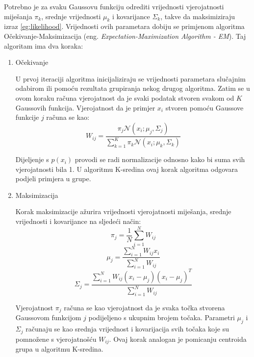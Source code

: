 \documentclass[utf8, diplomski, numeric]{fer}
\begin{document}
Potrebno je za svaku Gaussovu funkciju odrediti vrijednosti vjerojatnosti miješanja $\pi_k$, srednje vrijednosti $\mu_k$ i kovarijance $\Sigma_k$, takve da maksimiziraju izraz \ref{eg:likelihood}. Vrijednosti ovih parametara dobiju se primjenom algoritma Očekivanje-Maksimizacija (eng. \textit{Expectation-Maximization Algorithm - EM}). Taj algoritam ima dva koraka:
\begin{enumerate}
\item Očekivanje

U prvoj iteraciji algoritma inicijaliziraju se vrijednosti parametara slučajnim odabirom ili pomoću rezultata grupiranja nekog drugog algoritma. Zatim se u ovom koraku računa vjerojatnost da je svaki podatak stvoren svakom od $K$ Gaussovih funkcija. Vjerojatnost da je primjer $x_i$ stvoren pomoću Gaussove funkcije $j$ računa se kao:
\begin{equation}\label{eq:expectation}
W_{ij} = \frac{\pi_j \mathcal{N}(x_i;\mu_j,\Sigma_j)}{\sum_{k=1}^{K} \pi_k \mathcal{N}(x_i;\mu_k,\Sigma_k)}
\end{equation}

Dijeljenje s $p(x_i)$ provodi se radi normalizacije odnosno kako bi suma svih vjerojatnosti bila 1. U algoritmu K-sredina ovaj korak algoritma odgovara podjeli primjera u grupe.
\item Maksimizacija

Korak maksimizacije ažurira vrijednosti vjerojatnosti miješanja, srednje vrijednosti i kovarijance na sljedeći način:
\begin{equation}\label{eq:max}
\pi_j = \frac{1}{N}\sum_{i=1}^{N} W_{ij}
\end{equation}
\begin{equation}\label{eq:max}
\mu_j = \frac{\sum_{i=1}^{N} W_{ij}x_i}{\sum_{i=1}^{N} W_{ij}}
\end{equation}
\begin{equation}\label{eq:max}
\Sigma_j = \frac{\sum_{i=1}^{N} W_{ij}(x_i-\mu_j)(x_i-\mu_j)^T}{\sum_{i=1}^{N} W_{ij}}
\end{equation}

Vjerojatnost $\pi_j$ računa se kao vjerojatnost da je svaka točka stvorena Gaussovom funkcijom $j$ podijeljeno s ukupnim brojem točaka. Parametri $\mu_j$ i $\Sigma_j$ računaju se kao srednja vrijednost i kovarijacija svih točaka koje su pomnožene s vjerojatnošću $W_{ij}$. Ovaj korak analogan je pomicanju centroida grupa u algoritmu K-sredina.

\end{enumerate}
\end{document}
